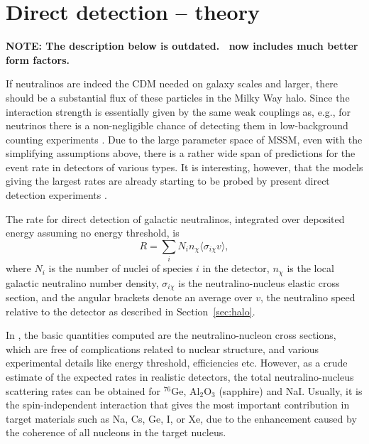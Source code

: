 \section{Direct detection -- theory}

{\bfseries NOTE: The description below is outdated. \ds\ now includes
much better form factors.}

If  neutralinos are indeed the CDM needed on galaxy scales and larger,
there should be a substantial flux of these particles in the Milky
Way halo. Since the interaction strength  is
essentially given by the same weak couplings as, e.g., for neutrinos
there is a non-negligible chance of detecting them in low-background
counting experiments \cite{goodmanwitten}.
Due to the large parameter space of MSSM, even
with the simplifying assumptions above, there is a rather wide span of
predictions for the event rate in detectors of various types. It is
interesting, however, that the models giving the largest rates are
already starting to be probed by present direct detection
experiments \cite{bg,bottino}.


The rate for direct detection of galactic neutralinos, integrated over
deposited energy assuming no energy threshold, is
\begin{equation}
   R = \sum_i N_i n_\chi \langle \sigma_{i\chi} v \rangle ,
\end{equation}
where $ N_i $ is the number of nuclei of species $i$ in the detector,
$n_\chi$ is the local galactic neutralino number density, $
\sigma_{i\chi} $ is the neutralino-nucleus elastic cross section, and
the angular brackets denote an average over $ v $, the neutralino
speed relative to the detector as described in Section~\ref{sec:halo}.

In \ds, the basic quantities computed are the neutralino-nucleon cross
sections, which are free of complications related to nuclear
structure, and various experimental details like energy threshold,
efficiencies etc.  However, as a crude estimate of the expected rates
in realistic detectors, the total neutralino-nucleus scattering rates
can be obtained for $^{76}$Ge, Al$_2$O$_3$ (sapphire) and NaI.
Usually, it is the spin-independent interaction that gives the most
important contribution in target materials such as Na, Cs, Ge, I, or
Xe, due to the enhancement caused by the coherence of all nucleons in
the target nucleus.

